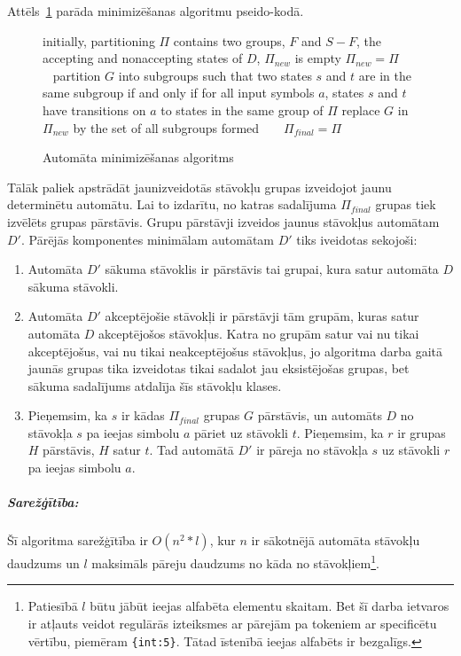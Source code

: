 Attēls~\ref{fig:min_algorithm} parāda minimizēšanas algoritmu pseido-kodā.

\begin{figure}[h]
  \begin{algorithmic}
  \State initially, partitioning $\Pi$ contains two groups, $F$ and $S-F$, the accepting and nonaccepting states of $D$, $\Pi_{new}$ is empty
      \State $\Pi_{new} = \Pi$
          \State partition $G$ into subgroups such that two states $s$ and $t$ are in the same subgroup if and only if for all input symbols $a$, states $s$ and $t$ have transitions on $a$ to states in the same group of $\Pi$
          \State replace $G$ in $\Pi_{new}$ by the set of all subgroups formed
      \EndFor
  \EndWhile
  \State $\Pi_{final} = \Pi$
  \end{algorithmic}
  \caption{\label{fig:min_algorithm}Automāta minimizēšanas algoritms}
\end{figure}

Tālāk paliek apstrādāt jaunizveidotās stāvokļu grupas izveidojot jaunu determinētu automātu. Lai to izdarītu, no katras sadalījuma $\Pi_{final}$ grupas tiek izvēlēts grupas pārstāvis. Grupu pārstāvji izveidos jaunus stāvokļus automātam $D'$. Pārējās komponentes minimālam automātam $D'$ tiks iveidotas sekojoši:
\begin{enumerate}
\item Automāta $D'$ sākuma stāvoklis ir pārstāvis tai grupai, kura satur automāta $D$ sākuma stāvokli.
\item Automāta $D'$ akceptējošie stāvokļi ir pārstāvji tām grupām, kuras satur automāta $D$ akceptējošos stāvokļus. Katra no grupām satur vai nu tikai akceptējošus, vai nu tikai neakceptējošus stāvokļus, jo algoritma darba gaitā jaunās grupas tika izveidotas tikai sadalot jau eksistējošas grupas, bet sākuma sadalījums atdalīja šīs stāvokļu klases.
\item Pieņemsim, ka $s$ ir kādas $\Pi_{final}$ grupas $G$ pārstāvis, un automāts $D$ no stāvokļa $s$ pa ieejas simbolu $a$ pāriet uz stāvokli $t$. Pieņemsim, ka $r$ ir grupas $H$ pārstāvis, $H$ satur $t$. Tad automātā $D'$ ir pāreja no stāvokļa $s$ uz stāvokli $r$ pa ieejas simbolu $a$.
\end{enumerate}

\subparagraph{Sarežģītība:}
Šī algoritma sarežģītība ir $O(n^2*l)$, kur $n$ ir sākotnējā automāta stāvokļu daudzums un $l$ maksimāls pāreju daudzums no kāda no stāvokļiem\footnote{Patiesībā $l$ būtu jābūt ieejas alfabēta elementu skaitam. Bet šī darba ietvaros ir atļauts veidot regulārās izteiksmes ar pārejām pa tokeniem ar specificētu vērtību, piemēram \texttt{\{int:5\}}. Tātad īstenībā ieejas alfabēts ir bezgalīgs.}.

